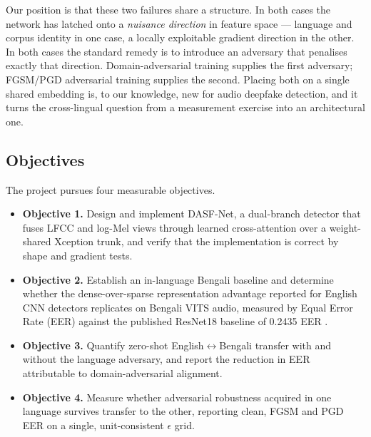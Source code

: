 \documentclass[conference]{IEEEtran}
\renewcommand{\cite}[1]{\unskip}
\begin{document}
Our position is that these two failures share a structure. In both cases the
network has latched onto a \emph{nuisance direction} in feature space ---
language and corpus identity in one case, a locally exploitable gradient
direction in the other. In both cases the standard remedy is to introduce an
adversary that penalises exactly that direction. Domain-adversarial training
\cite{ganin2016dann} supplies the first adversary; FGSM/PGD adversarial
training \cite{goodfellow2015fgsm,madry2018pgd} supplies the second. Placing
both on a single shared embedding is, to our knowledge, new for audio deepfake
detection, and it turns the cross-lingual question from a measurement exercise
into an architectural one.

\subsection{Objectives}
The project pursues four measurable objectives.

\begin{itemize}
\item \textbf{Objective 1.} Design and implement DASF-Net, a dual-branch
      detector that fuses LFCC and log-Mel views through learned
      cross-attention over a weight-shared Xception trunk, and verify that the
      implementation is correct by shape and gradient tests.
\item \textbf{Objective 2.} Establish an in-language Bengali baseline and
      determine whether the dense-over-sparse representation advantage
      reported for English CNN detectors \cite{ahmed2026melspec} replicates on
      Bengali VITS audio, measured by Equal Error Rate (EER) against the
      published ResNet18 baseline of 0.2435 EER \cite{samu2025zeroshot}.
\item \textbf{Objective 3.} Quantify zero-shot English$\leftrightarrow$Bengali
      transfer with and without the language adversary, and report the
      reduction in EER attributable to domain-adversarial alignment.
\item \textbf{Objective 4.} Measure whether adversarial robustness acquired in
      one language survives transfer to the other, reporting clean, FGSM and
      PGD EER on a single, unit-consistent $\epsilon$ grid.
\end{itemize}
\end{document}
